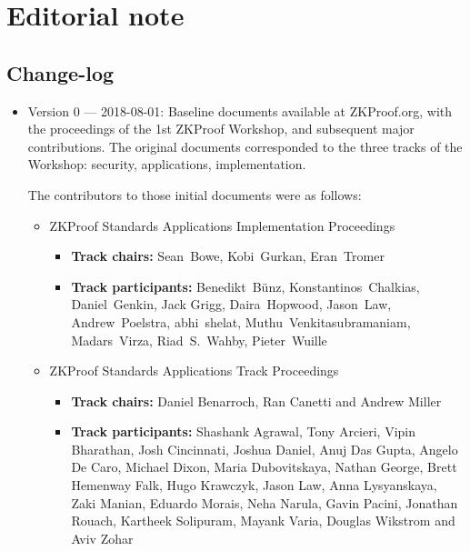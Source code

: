 \section*{Editorial note}



\subsection*{Change-log}


\begin{itemize}

\item Version 0 --- 2018-08-01: 
	Baseline documents available at ZKProof.org, with the proceedings 
of the 1st ZKProof Workshop, and subsequent major contributions.
	The original documents corresponded to the three tracks of the Workshop: security, applications, implementation.
	
	The contributors to those initial documents were as follows:
	\begin{itemize}
	

	\item ZKProof Standards Applications Implementation Proceedings
			\begin{itemize}
			\item \textbf{Track chairs:} 
			Sean Bowe, Kobi Gurkan, Eran Tromer
			
			\item \textbf{Track participants:} 
			Benedikt Bünz, Konstantinos Chalkias, Daniel Genkin, Jack Grigg, Daira Hopwood, Jason Law, Andrew Poelstra, abhi shelat, Muthu Venkita\-subramaniam, Madars Virza, Riad S. Wahby, Pieter Wuille		
			\end{itemize}

	
	\item ZKProof Standards Applications Track Proceedings
			\begin{itemize}
			\item \textbf{Track chairs:} 
			Daniel Benarroch, Ran Canetti and Andrew Miller
			\item \textbf{Track participants:} 
			Shashank Agrawal, Tony Arcieri, Vipin Bharathan, Josh Cincinnati, Joshua Daniel,  Anuj Das Gupta, Angelo De Caro, Michael Dixon, Maria Dubovitskaya, Nathan George, Brett Hemenway Falk, Hugo Krawczyk, Jason Law, Anna Lysyanskaya, Zaki Manian, Eduardo Morais, Neha Narula, Gavin Pacini, Jonathan Rouach, Kartheek Solipuram, Mayank Varia, Douglas Wikstrom and Aviv Zohar 
			\end{itemize}
	

\end{itemize}
\end{itemize}

